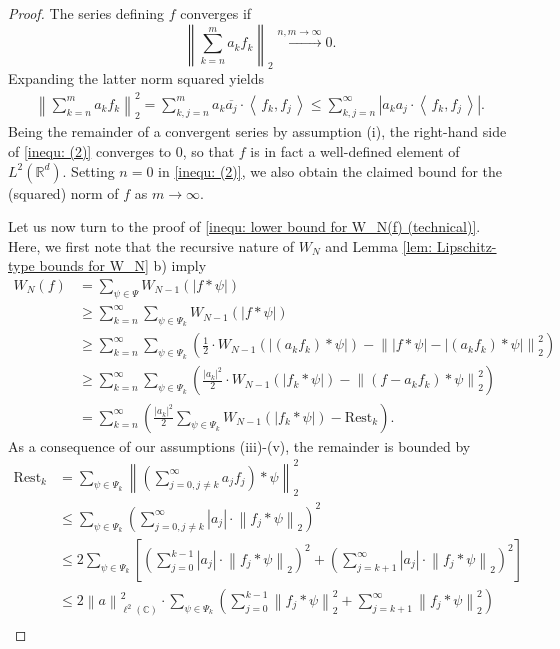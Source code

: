 \documentclass[11pt]{amsart}
\newcommand{\R}{{\mathbb{R}}}
\newcommand{\C}{{\mathbb{C}}}
\newcommand{\norm}[1]{\ensuremath{\left\lVert\text{}#1\text{}\right\rVert}}
\newcommand{\ip}[1]{\ensuremath{\left<\text{} \, #1 \, \text{}\right>}}
\newenvironment{proof sketch} {\textit{Proof sketch.}}{}
\begin{document}
  \begin{proof}
    The series defining $f$ converges if 
    \[\norm{\sum_{k=n}^m a_k f_k}_2 \xrightarrow{n,m \to \infty} 0.\] 
    Expanding the latter norm squared yields
    \begin{align}\label{inequ: (2)}
      \norm{\sum_{k=n}^m a_k f_k}_2^2 = \sum_{k,j=n}^m a_k \overline{a_j} \cdot \ip{f_k,f_j} \leq \sum_{k,j=n}^\infty \left|a_k a_j \cdot \ip{f_k,f_j}\right|.
    \end{align}
    Being the remainder of a convergent series by assumption (i), the right-hand side of \eqref{inequ: (2)} converges to $0$, so that $f$ is in fact a well-defined element of $L^2(\R^d)$. Setting $n=0$ in \eqref{inequ: (2)}, we also obtain the claimed bound for the (squared) norm of $f$ as $m \to \infty$.
  
    Let us now turn to the proof of \eqref{inequ: lower bound for W_N(f) (technical)}. Here, we first note that the recursive nature of $W_{N}$ and Lemma \ref{lem: Lipschitz-type bounds for W_N} b) imply
    \begin{align}\label{inequ: (1)}
      W_{N}(f) &= \sum_{\psi \in \Psi} W_{N-1}(|f*\psi|) \nonumber\\
      &\geq \sum_{k=n}^\infty \sum_{\psi \in \Psi_k}W_{N-1}(|f*\psi|)\nonumber\\
      &\geq \sum_{k=n}^\infty \sum_{\psi \in \Psi_k} \left(\frac{1}{2} \cdot W_{N-1}(|(a_kf_k)*\psi|)-\norm{|f*\psi|-|(a_kf_k)*\psi|}_2^2\right) \nonumber\\
      &\geq \sum_{k=n}^\infty \sum_{\psi \in \Psi_k} \left(\frac{|a_k|^2}{2} \cdot W_{N-1}(|f_k*\psi|)-\norm{(f-a_kf_k)*\psi}_2^2\right) \nonumber\\
      &= \sum_{k=n}^\infty \left(\frac{|a_k|^2}{2} \sum_{\psi \in \Psi_k}  W_{N-1}(|f_k*\psi|) - \text{Rest}_k\right).
    \end{align}
    As a consequence of our assumptions (iii)-(v), the remainder is bounded by
    \begin{align*}
      \text{Rest}_k &= \sum_{\psi \in \Psi_k} \norm{\left(\sum_{j=0,j\neq k}^\infty a_j f_j\right)*\psi}_2^2 \\
      &\leq \sum_{\psi \in \Psi_k} \left(\sum_{j=0,j\neq k}^\infty |a_j| \cdot \norm{f_j*\psi}_2\right)^2 \\
      &\leq 2 \sum_{\psi \in \Psi_k} \left[\left(\sum_{j=0}^{k-1} |a_j|\cdot \norm{f_j*\psi}_2\right)^2 + \left(\sum_{j=k+1}^{\infty} |a_j|\cdot \norm{f_j*\psi}_2\right)^2\right] \\
      &\leq 2 \norm{a}_{\ell^2(\C)}^2 \cdot \sum_{\psi \in \Psi_k} \left(\sum_{j=0}^{k-1} \norm{f_j*\psi}_2^2 + \sum_{j=k+1}^{\infty} \norm{f_j*\psi}_2^2\right)\\

\end{align*}
\end{proof}
\end{document}
